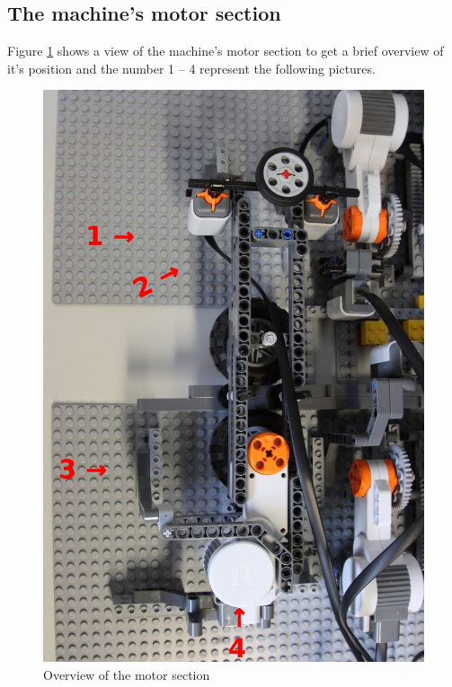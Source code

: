 \documentclass[%
  a4paper,%
  11pt,%
  blue,%
  hyperref	%
  ]{tubsartcl}
\begin{document}
\subsection{The machine's motor section}

Figure \ref{pic:topview} shows a view of the machine's motor section to get a brief overview of it's position and the number 1 -- 4 represent the following pictures.

\begin{figure}[!htb]
\begin{center}
\includegraphics[scale=0.28]{graphics_lego/topview.jpg}
\end{center}
\caption{Overview of the motor section}
\label{pic:topview}
\end{figure}
\end{document}
